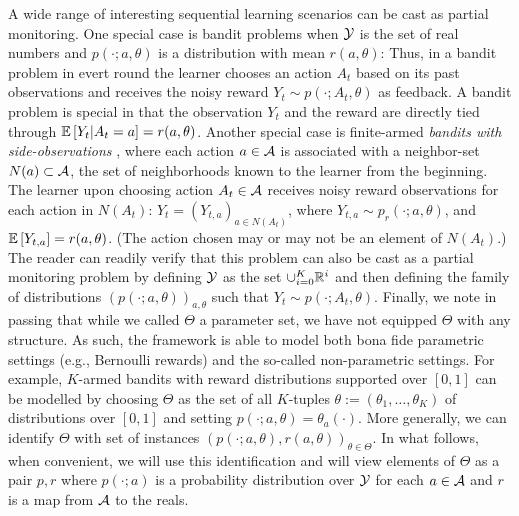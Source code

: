 A wide range of interesting sequential learning scenarios can be cast as partial monitoring.
One special case is bandit problems when $\mathcal{Y}$ is the set of real numbers and $p(\cdot;a,\theta)$ is a distribution with mean
$r(a,\theta)$: Thus, in a bandit problem in evert round the learner chooses an action $A_t$ based on its past observations
and receives the noisy reward $Y_t \sim p(\cdot;A_t,\theta)$ as feedback. 
A bandit problem is special in that the observation $Y_t$ and the reward are directly tied through $\mathbb{E}\left[Y_t|A_t=a\right] = r(a,\theta)$.
Another special case is finite-armed  \emph{bandits with side-observations} \citet{},
where each action $a\in \mathcal{A}$ is associated with a neighbor-set $N(a)\subset \mathcal{A}$, 
the set of neighborhoods known to the learner from the beginning.
The learner upon choosing action $A_t\in \mathcal{A}$ receives noisy reward observations for each action in $N(A_t)$:
$Y_t  = (Y_{t,a})_{a\in N(A_t)}$, where $Y_{t,a} \sim p_r(\cdot;a,\theta)$, and $\mathbb{E}\left[Y_{t,a}\right] = r(a,\theta)$.
(The action chosen may or may not be an element of $N(A_t)$.)
The reader can readily verify that this problem can also be cast as a partial monitoring problem
by defining $\mathcal{Y}$ as the set $\cup_{i=0}^K \mathbb{R}^i$ and then defining 
the family of distributions $(p(\cdot;a,\theta))_{a,\theta}$ such that $Y_t \sim p(\cdot;A_t,\theta)$.
Finally, we note in passing that while we called $\Theta$ a parameter set, 
we have not equipped $\Theta$ with any structure. As such,
the framework is able to model both bona fide parametric settings (e.g., Bernoulli rewards) and 
the so-called non-parametric settings. For example, $K$-armed bandits with reward distributions supported
over $[0,1]$ can be modelled by choosing $\Theta$ as the set of all $K$-tuples 
$\theta:=(\theta_1,\dots,\theta_K)$ of distributions over $[0,1]$ and setting $p(\cdot;a,\theta) = \theta_a(\cdot)$.
More generally, we can identify $\Theta$ with set of instances $(p(\cdot;a,\theta),r(a,\theta))_{\theta\in \Theta}$.
In what follows, when convenient, we will use this identification and will view elements of $\Theta$ as a pair $p,r$ 
where $p(\cdot;a)$ is a probability distribution over $\mathcal{Y}$ for each $a\in \mathcal{A}$ and $r$ is a map from $\mathcal{A}$ to the reals.
